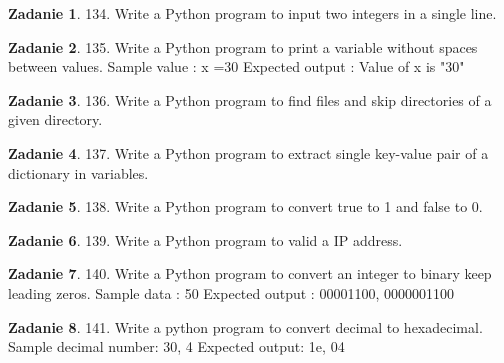 \documentclass[11pt]{article}
\theoremstyle{definition}
\newtheorem{zadanie}{Zadanie}
\begin{document}
\begin{zadanie}


134. Write a Python program to input two integers in a single line. 

\end{zadanie}

\begin{zadanie}


135. Write a Python program to print a variable without spaces between values. 
Sample value : x =30
Expected output : Value of x is "30"

\end{zadanie}

\begin{zadanie}


136. Write a Python program to find files and skip directories of a given directory. 

\end{zadanie}

\begin{zadanie}


137. Write a Python program to extract single key-value pair of a dictionary in variables. 

\end{zadanie}

\begin{zadanie}


138. Write a Python program to convert true to 1 and false to 0. 

\end{zadanie}

\begin{zadanie}


139. Write a Python program to valid a IP address. 

\end{zadanie}

\begin{zadanie}


140. Write a Python program to convert an integer to binary keep leading zeros. 
Sample data : 50
Expected output : 00001100, 0000001100

\end{zadanie}

\begin{zadanie}


141. Write a python program to convert decimal to hexadecimal. 
Sample decimal number: 30, 4
Expected output: 1e, 04

\end{zadanie}
\end{document}
